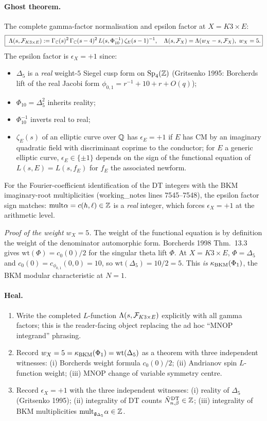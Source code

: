 \paragraph{Ghost theorem.}
The complete gamma-factor normalisation and epsilon factor at
$X=K3\times E$:
\[
\boxed{\
\Lambda(s,\mathcal{F}_{K3\times E})
:=\Gamma_{\mathbb{C}}(s)^2\,\Gamma_{\mathbb{C}}(s-4)^2\,L(s,\Phi_{10}^{-1})\,\zeta_E(s-1)^{-1},
\quad \Lambda(s,\mathcal{F}_X)=\Lambda(w_X-s,\mathcal{F}_X),\ w_X=5.
}
\]
The epsilon factor is $\epsilon_X=+1$ since:
\begin{itemize}[leftmargin=1.5em]
\item $\Delta_5$ is a \emph{real} weight-$5$ Siegel cusp form on
  $\mathrm{Sp}_4(\mathbb{Z})$ (Gritsenko 1995: Borcherds lift of the real Jacobi
  form $\phi_{0,1}=r^{-1}+10+r+O(q)$);
\item $\Phi_{10}=\Delta_5^2$ inherits reality;
\item $\Phi_{10}^{-1}$ inverts real to real;
\item $\zeta_E(s)$ of an elliptic curve over $\mathbb{Q}$ has
  $\epsilon_E=+1$ if $E$ has CM by an imaginary quadratic field
  with discriminant coprime to the conductor; for $E$ a generic
  elliptic curve, $\epsilon_E\in\{\pm 1\}$ depends on the sign of
  the functional equation of $L(s,E)=L(s,f_E)$ for $f_E$ the
  associated newform.
\end{itemize}

For the Fourier-coefficient identification of the DT integers
with the BKM imaginary-root multiplicities (working\_notes lines
7545--7548), the epsilon factor sign matches:
$\mathrm{mult}\alpha=c(h,\ell)\in\mathbb{Z}$ is a \emph{real} integer, which
forces $\epsilon_X=+1$ at the arithmetic level.

\emph{Proof of the weight $w_X=5$.} The weight of the functional
equation is by definition the weight of the denominator
automorphic form. Borcherds 1998 Thm.\ 13.3 gives
$\mathrm{wt}(\Phi)=c_0(0)/2$ for the singular theta lift $\Phi$.
At $X=K3\times E$, $\Phi=\Delta_5$ and $c_0(0)=c_{\phi_{0,1}}(0,0)=10$,
so $\mathrm{wt}(\Delta_5)=10/2=5$. This \emph{is} $\kappa_{\mathrm{BKM}}(\Phi_1)$,
the BKM modular characteristic at $N=1$.

\paragraph{Heal.}
\begin{enumerate}[label=(H\arabic*),leftmargin=1.5em]
\item Write the completed $L$-function $\Lambda(s,\mathcal{F}_{K3\times E})$
  explicitly with all gamma factors; this is the
  reader-facing object replacing the ad hoc ``MNOP integrand''
  phrasing.
\item Record $w_X=5=\kappa_{\mathrm{BKM}}(\Phi_1)=\mathrm{wt}(\Delta_5)$ as a
  theorem with three independent witnesses:
  (i) Borcherds weight formula $c_0(0)/2$;
  (ii) Andrianov spin $L$-function weight;
  (iii) MNOP change of variable symmetry centre.
\item Record $\epsilon_X=+1$ with the three independent witnesses:
  (i) reality of $\Delta_5$ (Gritsenko 1995);
  (ii) integrality of DT counts $\tilde N^{\mathrm{DT}}_{n,\beta}\in\mathbb{Z}$;
  (iii) integrality of BKM multiplicities
  $\mathrm{mult}_{\mathfrak{g}_{\Delta_5}}\alpha\in\mathbb{Z}$.
\end{enumerate}

